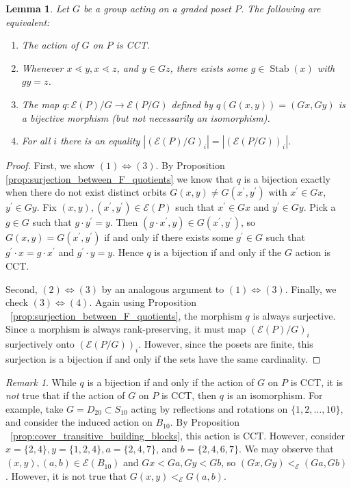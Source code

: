 \documentclass[smallextended, envcountsame, numbook]{svjour3}
\theoremstyle{plain}
\newtheorem{lem}[thm]{Lemma}
\theoremstyle{definition}
\theoremstyle{remark}
\newtheorem{rmk}[thm]{Remark}
\numberwithin{equation}{section}
\renewcommand{\iff}{\Leftrightarrow}
\newcommand\Stab{\operatorname{Stab}}
\begin{document}
\begin{lem}
\label{lem:cover_transitive_equivalence}
Let $G$ be a group acting on a graded poset $P$. The following are equivalent:
\begin{enumerate}
  \item The action of $G$ on $P$ is CCT.
  \item Whenever $x \lessdot y,x \lessdot z$, and $y \in Gz$, there exists some $g \in \Stab(x)$ with $gy = z$.
  \item The map $q\colon \mathcal E(P)/G\rightarrow \mathcal E(P/G)$ defined by $q(G(x, y)) = (Gx,Gy)$ is a bijective morphism (but not necessarily an isomorphism).
  \item For all $i$ there is an equality $|(\mathcal E(P)/G)_i|=| (\mathcal E(P/G))_i|$.
\end{enumerate}
\end{lem}
\begin{proof}
First, we show $(1) \iff (3)$. By Proposition \ref{prop:surjection_between_F_quotients} we know that $q$ is a bijection exactly when there do not exist distinct orbits $G(x, y) \ne G(x^\prime, y^\prime)$ with $x^\prime\in Gx$, $y^\prime\in Gy$.  Fix $(x, y), (x^\prime, y^\prime)\in \mathcal E(P)$ such that $x^\prime\in Gx$ and $y^\prime\in Gy$.  Pick a $g\in G$ such that $g\cdot y^\prime = y$.  Then $(g\cdot x^\prime, y)\in G(x^\prime, y^\prime)$, so $G(x, y) = G(x^\prime, y^\prime)$ if and only if there exists some $g^\prime\in G$ such that $g^\prime\cdot x = g\cdot x^\prime$ and $g^\prime\cdot y = y$. Hence $q$ is a bijection if and only if the $G$ action is CCT.

Second, $(2) \iff (3)$ by an analogous argument to $(1) \iff (3)$.
Finally, we check $(3)\iff (4)$. Again using Proposition ~\ref{prop:surjection_between_F_quotients}, the morphism $q$ is always surjective. Since a morphism is always rank-preserving, it must map $(\mathcal E(P)/G)_i$ surjectively onto $(\mathcal E(P/G))_i$. However, since the posets are finite, this surjection is a bijection if and only if the sets have the same cardinality.
\end{proof}

\begin{rmk}
While $q$ is a bijection if and only if the action of $G$ on $P$ is CCT, it is {\it not} true that if the action of $G$ on $P$ is CCT, then $q$ is an isomorphism.  For example, take $G=D_{20} \subset S_{10}$ acting by reflections and rotations on $\{1,2,\ldots,10\}$, and consider the induced action on $B_{10}$. By Proposition ~\ref{prop:cover_transitive_building_blocks}, this action is CCT. However, consider $x = \{2,4\},y = \{1,2,4\},a = \{2,4,7\}$, and $b = \{2,4,6,7\}$. We may observe that $(x , y),(a, b) \in \mathcal E(B_{10})$ and $Gx < Ga, Gy < Gb$, so $(Gx, Gy) <_{\mathcal E} (Ga, Gb)$. However, it is not true that $G(x, y)<_{\mathcal E} G(a,b)$.  
\end{rmk}
\end{document}
